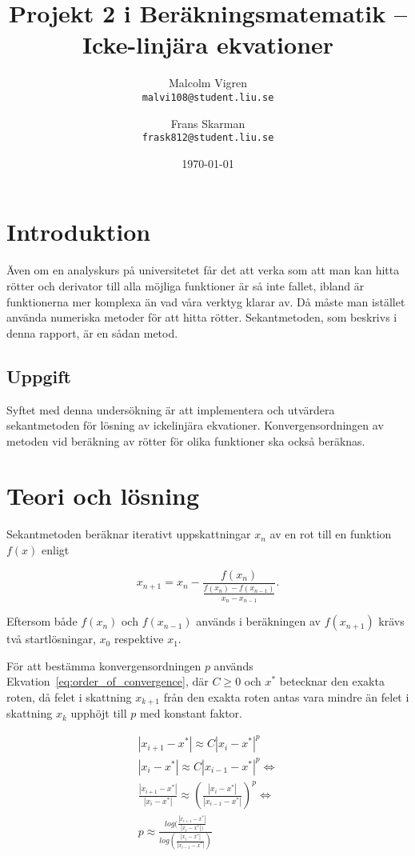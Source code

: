 \documentclass[a4paper,titlepage]{article}
\title{%
    \textbf{Projekt 2 i Beräkningsmatematik -- Icke-linjära ekvationer }}
\date{\today}
\author{%
    Malcolm Vigren \\
    \texttt{malvi108@student.liu.se}
    \and
    Frans Skarman\\
    \texttt{frask812@student.liu.se}
    }
\begin{document}
\maketitle
\newpage
\tableofcontents
\newpage

\section{Introduktion}

Även om en analyskurs på universitetet får det att verka som att man kan hitta rötter
och derivator till alla möjliga funktioner är så inte fallet, ibland är funktionerna
mer komplexa än vad våra verktyg klarar av. Då måste man istället använda
numeriska metoder för att hitta rötter. Sekantmetoden, som beskrivs i denna
rapport, är en sådan metod.

\subsection{Uppgift}

Syftet med denna undersökning är att implementera och utvärdera sekantmetoden
för lösning av ickelinjära ekvationer. Konvergensordningen av metoden vid
beräkning av rötter för olika funktioner ska också beräknas.

\section{Teori och lösning}

Sekantmetoden beräknar iterativt uppskattningar $x_n$ av en rot till en
funktion $f(x)$ enligt

\begin{equation}
    \label{eq:seq}
    x_{n+1} = x_{n} -
    \frac{f(x_n)}
        {\frac{f(x_n) - f(x_{n-1})}
                {x_n - x_{n-1}}
        }.
\end{equation}

Eftersom både $f(x_n)$ och $f(x_{n-1})$ används i beräkningen av $f(x_{n+1})$ krävs
två startlösningar, $x_0$ respektive $x_1$.

För att bestämma konvergensordningen $p$ används Ekvation~\ref{eq:order_of_convergence}, där
$C \geq 0$ och $x^*$ betecknar den exakta roten, då felet i skattning $x_{k+1}$ 
från den exakta roten antas vara mindre än felet i skattning $x_{k}$ upphöjt till
$p$ med konstant faktor.

\begin{equation}
    \begin{gathered}
        |x_{i+1} - x^*| \approx C |x_i - x^*|^p \\
        |x_i - x^*| \approx C |x_{i-1} - x^*|^p \Leftrightarrow \\
        \frac{|x_{i+1} - x^*|}{|x_i - x^*|} \approx
                (\frac{|x_i - x^*|}{|x_{i-1} - x^*|})^p \Leftrightarrow \\

        p \approx \frac{log(\frac{|x_{i+1} - x^*|}{|x_i - x^*|)}}{log(\frac{|x_i - x^*|}{|x_{i-1} - x^*|})}
    \end{gathered}
    \label{eq:order_of_convergence}
\end{equation}
\end{document}
